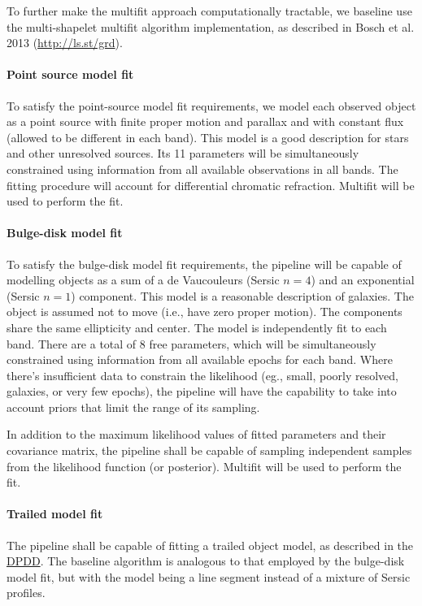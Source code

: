 \documentclass[12pt]{article}
\newcommand{\ds}[2]{{\color{blue} \href{https://docushare.lsstcorp.org/docushare/dsweb/Get/#1}{#2}}\xspace}
\newcommand{\DPDD}{\ds{LSE-163}{DPDD}}
\begin{document}
To further make the multifit approach computationally tractable, we baseline use the multi-shapelet multifit algorithm implementation, as described in Bosch et al. 2013 (\url{http://ls.st/grd}).

\paragraph{Point source model fit} To satisfy the point-source model fit requirements, we model each observed object as a point source with finite proper motion and parallax and with constant flux (allowed to be different in each band). This model is a good description for stars and other unresolved sources. Its 11 parameters will be simultaneously constrained using information from all available observations in all bands. The fitting procedure will account for differential chromatic refraction. Multifit will be used to perform the fit.

\paragraph{Bulge-disk model fit} To satisfy the bulge-disk model fit requirements, the pipeline will be capable of modelling objects as a sum of a de Vaucouleurs (Sersic $n=4$) and an exponential (Sersic $n=1$) component. This model is a reasonable description of galaxies. The object is assumed not to move (i.e., have zero proper motion). The components share the same ellipticity and center. The model is independently fit to each band. There are a total of 8 free parameters, which will be simultaneously constrained using information from all available epochs for each band. Where there's insufficient data to constrain the likelihood (eg., small, poorly resolved, galaxies, or very few epochs), the pipeline will have the capability to take into account priors that limit the range of its sampling.

In addition to the maximum likelihood values of fitted parameters and their covariance matrix, the pipeline shall be capable of sampling independent samples from the likelihood function (or posterior). Multifit will be used to perform the fit.

\paragraph{Trailed model fit}

The pipeline shall be capable of fitting a trailed object model, as described in the \DPDD. The baseline algorithm is analogous to that employed by the bulge-disk model fit, but with the model being a line segment instead of a mixture of Sersic profiles.
\end{document}
